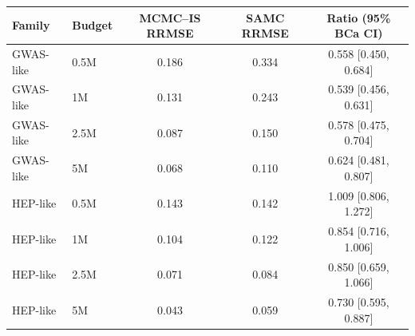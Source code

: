 \begin{tabular}{llccc}
\toprule
Family & Budget & MCMC--IS RRMSE & SAMC RRMSE & Ratio (95\% BCa CI) \\
\midrule
GWAS-like & 0.5M & 0.186 & 0.334 & 0.558 [0.450, 0.684] \\
GWAS-like & 1M & 0.131 & 0.243 & 0.539 [0.456, 0.631] \\
GWAS-like & 2.5M & 0.087 & 0.150 & 0.578 [0.475, 0.704] \\
GWAS-like & 5M & 0.068 & 0.110 & 0.624 [0.481, 0.807] \\
HEP-like & 0.5M & 0.143 & 0.142 & 1.009 [0.806, 1.272] \\
HEP-like & 1M & 0.104 & 0.122 & 0.854 [0.716, 1.006] \\
HEP-like & 2.5M & 0.071 & 0.084 & 0.850 [0.659, 1.066] \\
HEP-like & 5M & 0.043 & 0.059 & 0.730 [0.595, 0.887] \\
\bottomrule
\end{tabular}
